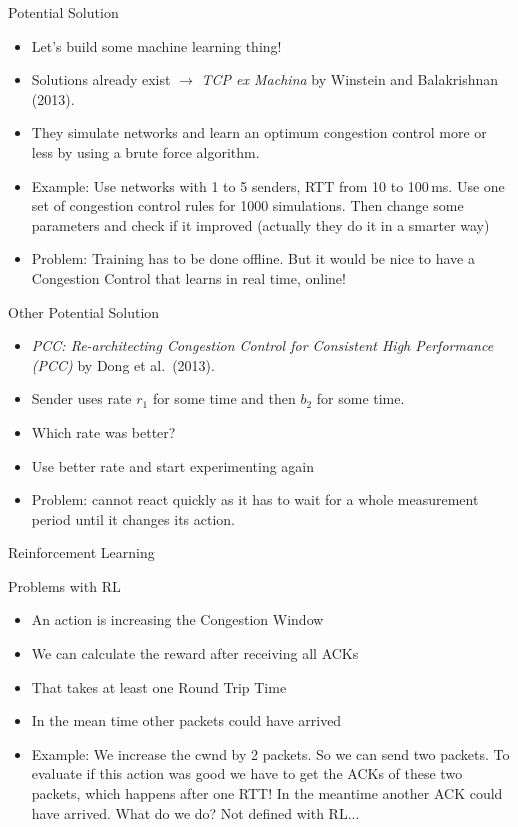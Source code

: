 \documentclass[11pt]{beamer}
\begin{document}
\begin{frame}{Potential Solution}
\begin{itemize}
\item Let's build some machine learning thing!
\item Solutions already exist $\rightarrow$ \textit{TCP ex Machina} by Winstein and Balakrishnan (2013).
\item They simulate networks and learn an optimum congestion control more or less by using a brute force algorithm.
\item Example: Use networks with 1 to 5 senders, RTT from 10 to 100\,ms. Use one set of congestion control rules for 1000 simulations. Then change some parameters and check if it improved (actually they do it in a smarter way)
\item Problem: Training has to be done offline. But it would be nice to have a Congestion Control that learns in real time, online!
\end{itemize}
\end{frame}

\begin{frame}{Other Potential Solution}
\begin{itemize}
\item \textit{PCC: Re-architecting Congestion Control for Consistent High Performance (PCC)} by Dong et al.~(2013).
\item Sender uses rate $r_1$ for some time and then $b_2$ for some time. 
\item Which rate was better? 
\item Use better rate and start experimenting again 
\item Problem: cannot react quickly as it has to wait for a whole measurement period until it changes its action. 
\end{itemize}
\end{frame}

\begin{frame}{Reinforcement Learning}
\centering

\end{frame}

\begin{frame}{Problems with RL}
\begin{itemize}
\item An action is increasing the Congestion Window
\item We can calculate the reward after receiving all ACKs
\item That takes at least one Round Trip Time
\item In the mean time other packets could have arrived
\item Example: We increase the cwnd by 2 packets. So we can send two packets. To evaluate if this action was good we have to get the ACKs of these two packets, which happens after one RTT!
In the meantime another ACK could have arrived. What do we do? Not defined with RL...
\end{itemize}
\end{frame}
\end{document}
